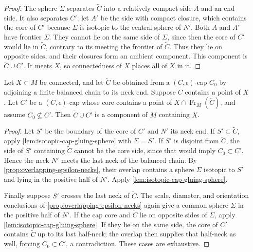 \begin{proof}
The sphere $\Sigma$ separates $\widetilde C$ into a relatively compact
side $A$ and an end side.  It also separates $C'$; let $A'$ be the side
with compact closure, which contains the core of $C'$ because $\Sigma$ is
isotopic to the central sphere of $N'$.  Both $A$ and $A'$ have frontier
$\Sigma$.  They cannot lie on the same side of $\Sigma$, since then the
core of $C'$ would lie in $\widetilde C$, contrary to its meeting the
frontier of $\widetilde C$.  Thus they lie on opposite sides, and their
closures form an ambient component.  This component is
$\widetilde C\cup C'$.  It meets $X$, so connectedness of $X$ places all
of $X$ in it.
\end{proof}

\begin{lemma}
\label{lem:adjacent-canonical-caps-form-component}
\notready
Let $X\subset M$ be connected, and let $\widetilde C$ be obtained from a
$(C,\epsilon)$-cap $C_0$ by adjoining a finite balanced chain to its neck
end.  Suppose $\widetilde C$ contains a point of $X$.  Let $C'$ be a
$(C,\epsilon)$-cap whose core contains a point of
$X\cap\operatorname{Fr}_M(\widetilde C)$, and assume
$C_0\nsubseteq C'$.  Then $\widetilde C\cup C'$ is a component of $M$
containing $X$.
\end{lemma}

\begin{proof}
Let $S'$ be the boundary of the core of $C'$ and $N'$ its neck end.
If $S'\subset\widetilde C$, apply
\ref{lem:isotopic-cap-gluing-sphere} with $\Sigma=S'$.  If $S'$ is
disjoint from $\widetilde C$, the side of $S'$ containing
$\widetilde C$ cannot be the core side, since that would imply
$C_0\subset C'$.  Hence the neck $N'$ meets the last neck of the balanced
chain.  By \ref{prop:overlapping-epsilon-necks}, their overlap contains a
sphere $\Sigma$ isotopic to $S'$ and lying in the positive half of $N'$.
Apply \ref{lem:isotopic-cap-gluing-sphere}.

Finally suppose $S'$ crosses the last neck of $\widetilde C$.  The scale,
diameter, and orientation conclusions of
\ref{prop:overlapping-epsilon-necks} again give a common sphere
$\Sigma$ in the positive half of $N'$.  If the cap core and
$\widetilde C$ lie on opposite sides of $\Sigma$, apply
\ref{lem:isotopic-cap-gluing-sphere}.  If they lie on the same side, the
core of $C'$ contains $\widetilde C$ up to its last half-neck; the overlap
then supplies that half-neck as well, forcing $C_0\subset C'$, a
contradiction.  These cases are exhaustive.
\end{proof}

